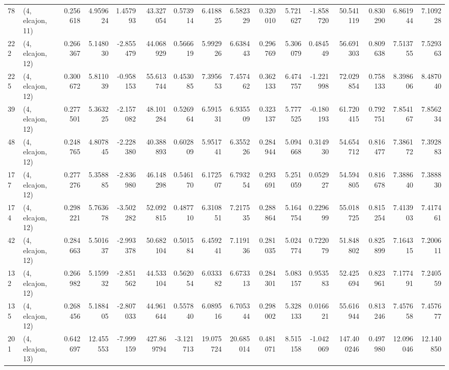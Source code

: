 \begin{tabular}{llrrrrrrrrrrrrrr}
78  &  (4, elcajon, 11) &   0.256618 &   4.959624 &  1.457993 &   43.327054 &  0.573914 &   6.418825 &   6.582329 &  0.320010 &   5.721627 &  -1.858720 &   50.541119 &  0.830290 &   6.861944 &   7.109228 \\
222 &  (4, elcajon, 12) &   0.266367 &   5.148030 & -2.855479 &   44.068929 &  0.566619 &   5.992926 &   6.638443 &  0.296769 &   5.306079 &   0.484549 &   56.691303 &  0.809638 &   7.513755 &   7.529363 \\
225 &  (4, elcajon, 12) &   0.300672 &   5.811039 & -0.958153 &   55.613744 &  0.453085 &   7.395653 &   7.457462 &  0.362133 &   6.474757 &  -1.221998 &   72.029854 &  0.758133 &   8.398606 &   8.487040 \\
39  &  (4, elcajon, 12) &   0.277501 &   5.363225 & -2.157082 &   48.101284 &  0.526964 &   6.591531 &   6.935509 &  0.323137 &   5.777525 &  -0.180193 &   61.720415 &  0.792751 &   7.854167 &   7.856234 \\
48  &  (4, elcajon, 12) &   0.248765 &   4.807845 & -2.228380 &   40.388893 &  0.602809 &   5.951741 &   6.355226 &  0.284944 &   5.094668 &   0.314930 &   54.654712 &  0.816477 &   7.386172 &   7.392883 \\
177 &  (4, elcajon, 12) &   0.277276 &   5.358885 & -2.836980 &   46.148298 &  0.546170 &   6.172507 &   6.793254 &  0.293691 &   5.251059 &   0.052927 &   54.594805 &  0.816678 &   7.388640 &   7.388830 \\
174 &  (4, elcajon, 12) &   0.298221 &   5.763678 & -3.502282 &   52.092815 &  0.487710 &   6.310851 &   7.217535 &  0.288864 &   5.164754 &   0.229699 &   55.018725 &  0.815254 &   7.413903 &   7.417461 \\
42  &  (4, elcajon, 12) &   0.284663 &   5.501637 & -2.993378 &   50.682104 &  0.501584 &   6.459241 &   7.119136 &  0.281035 &   5.024774 &   0.722079 &   51.848802 &  0.825899 &   7.164315 &   7.200611 \\
132 &  (4, elcajon, 12) &   0.266982 &   5.159932 & -2.851562 &   44.533104 &  0.562054 &   6.033382 &   6.673313 &  0.284301 &   5.083157 &   0.953583 &   52.425694 &  0.823961 &   7.177491 &   7.240559 \\
135 &  (4, elcajon, 12) &   0.268456 &   5.188405 & -2.807033 &   44.961644 &  0.557840 &   6.089516 &   6.705344 &  0.298002 &   5.328133 &   0.016621 &   55.616944 &  0.813246 &   7.457658 &   7.457677 \\
201 &  (4, elcajon, 13) &   0.642697 &  12.455553 & -7.999159 &  427.869794 & -3.121713 &  19.075724 &  20.685014 &  0.481071 &   8.515158 &  -1.042069 &  147.400246 &  0.497980 &  12.096046 &  12.140850 \\

\end{tabular}
